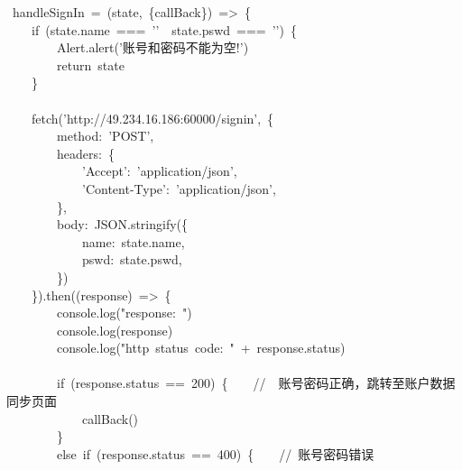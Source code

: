 \documentclass{article}
\begin{document}
\begin{mdpre}%
~handleSignIn~=~(state,~\{callBack\})~=\textgreater{}~\{\\
~~~~{if}~(state.name~===~{'}{'}~\textbar{}\textbar{}~state.pswd~===~{'}{'})~\{\\
~~~~~~~~Alert.alert({'}{账号和密码不能为空!}{'})\\
~~~~~~~~{return}~state\\
~~~~\}\\
\\
~~~~fetch({'}{http://49.234.16.186:60000/signin}{'},~\{\\
~~~~~~~~method:~{'}{POST}{'},\\
~~~~~~~~headers:~\{\\
~~~~~~~~~~~~{'}{Accept}{'}:~{'}{application/json}{'},\\
~~~~~~~~~~~~{'}{Content-Type}{'}:~{'}{application/json}{'},\\
~~~~~~~~\},\\
~~~~~~~~body:~JSON.stringify(\{\\
~~~~~~~~~~~~name:~state.name,\\
~~~~~~~~~~~~pswd:~state.pswd,\\
~~~~~~~~\})\\
~~~~\}).then((response)~=\textgreater{}~\{\\
~~~~~~~~console.log({"}{response:~}{"})\\
~~~~~~~~console.log(response)\\
~~~~~~~~console.log({"}{http~status~code:~}{"}~+~response.status)\\
\\
~~~~~~~~{if}~(response.status~==~{200})~\{~~~~{//　账号密码正确，跳转至账户数据同步页面}\\
~~~~~~~~~~~~callBack()\\
~~~~~~~~\}\\
~~~~~~~~{else}~{if}~(response.status~==~{400})~\{~~~~{//~账号密码错误}\\

\end{mdpre}
\end{document}
